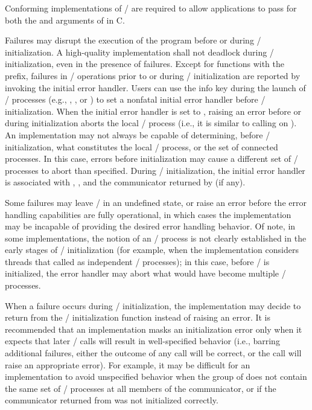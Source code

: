 Conforming implementations of \MPI/ are required to allow
applications to pass  for both the  and
 arguments of  in
C.

Failures may disrupt the execution of the program before
or during \MPI/ initialization. A high-quality implementation shall
not deadlock during \MPI/ initialization, even in the presence of failures.
Except for functions with the  prefix, failures in \MPI/ operations prior to or during \MPI/ initialization are reported by invoking
the initial error handler. Users can use the  info key
during the launch of \MPI/ processes (e.g., , , or ) to set a nonfatal initial error handler before \MPI/ initialization.
When the initial error handler is set to ,
raising an error before or during initialization aborts the local
\MPI/ process (i.e., it is similar to calling 
on ).
%
An implementation may not always be capable of determining,
before \MPI/ initialization, what constitutes the local \MPI/ process, or the set of
connected processes. In this case, errors before initialization may cause a different set
of \MPI/ processes to abort than specified.
%
During \MPI/ initialization, the initial error handler is associated with
, ,
and the communicator returned by  (if any).

\begin{implementors}
Some failures may leave \MPI/ in an undefined state, or raise an error
before the error handling capabilities are fully operational, in which cases
the implementation may be incapable of providing the desired error handling
behavior. Of note, in some implementations, the notion of an \MPI/ process
is not clearly established in the early stages of \MPI/ initialization (for
example, when the implementation considers threads that called 
as independent \MPI/ processes); in this case, before \MPI/ is initialized,
the  error handler may abort what would have become
multiple \MPI/ processes.

When a failure occurs during \MPI/ initialization,
the implementation may decide to return  from the \MPI/ initialization function
instead of raising an error.
It is recommended that an implementation
masks an initialization error only when it
expects that later \MPI/ calls will result in well-specified behavior (i.e., barring
additional failures, either the outcome of any call will be correct, or the call
will raise an appropriate error).
For example, it may be difficult for an implementation to
avoid unspecified behavior
 when the group of  does not contain
the same set of \MPI/ processes at all members of the communicator, or if the communicator
returned from  was not initialized correctly.
\end{implementors}

